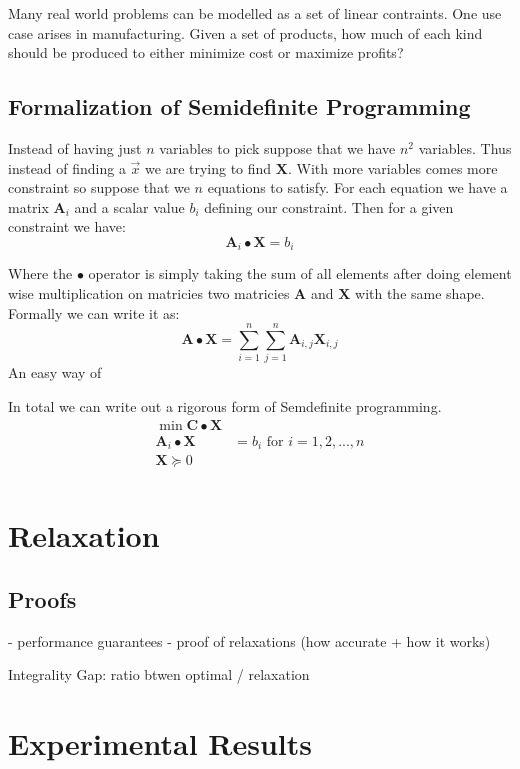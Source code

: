 \documentclass{article}
\begin{document}
Many real world problems can be modelled as a set of linear contraints. One use case arises in manufacturing.
Given a set of products, how much of each kind should be produced to either minimize cost or maximize profits?



\subsection{Formalization of Semidefinite Programming}
Instead of having just \( n \) variables to pick suppose that we have \( n^2 \) variables. Thus instead of finding a \( \vec{x} \) we are trying to find \( \mathbf{X} \). With more variables comes more constraint so suppose that we \( n \) equations to satisfy. For each equation we have a matrix \( \mathbf{A}_i \) and a scalar value \( b_i \) defining our constraint. Then for a given constraint we have:
\[
\mathbf{A}_i \bullet \mathbf{X} = b_i
\]

Where the \( \bullet \) operator is simply taking the sum of all elements after doing element wise multiplication on matricies two matricies \( \mathbf{A} \) and \( \mathbf{X} \) with the same shape. Formally we can write it as:
\[
  \mathbf{A} \bullet \mathbf{X} = \sum_{i = 1}^n \sum_{j = 1}^n \mathbf{A}_{i, j} \mathbf{X}_{i, j}
\]
An easy way of

In total we  can write out a rigorous form of Semdefinite programming.
\begin{align*}
  \min \mathbf{C} \bullet \mathbf{X} \\
  \mathbf{A}_i \bullet \mathbf{X} &= b_i  \text{   for } i = 1, 2, ..., n\\
  \mathbf{X} \succeq 0 \\
\end{align*}


\section{Relaxation}   %
\subsection{Proofs}
- performance guarantees
- proof of relaxations (how accurate + how it works)


Integrality Gap: ratio btwen optimal / relaxation 



\section{Experimental Results}
\end{document}
